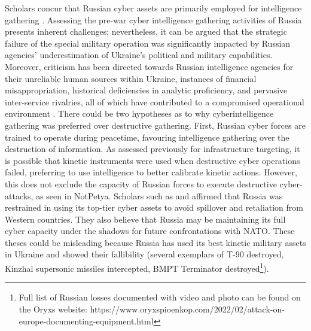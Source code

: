 Scholars concur that Russian cyber assets are primarily employed for intelligence gathering \parencite{baetman_2022_russias, levite_2023_integrating, beecroft_2022_evaluating, lin_2022_russian}. Assessing the pre-war cyber intelligence gathering activities of Russia presents inherent challenges; nevertheless, it can be argued that the strategic failure of the special military operation was significantly impacted by Russian agencies' underestimation of Ukraine's political and military capabilities. Moreover, criticism has been directed towards Russian intelligence agencies for their unreliable human sources within Ukraine, instances of financial misappropriation, historical deficiencies in analytic proficiency, and pervasive inter-service rivalries, all of which have contributed to a compromised operational environment \autocite{baetman_2022_russias}. There could be two hypotheses as to why cyberintelligence gathering was preferred over destructive gathering. First, Russian cyber forces are trained to operate during peacetime, favouring intelligence gathering over the destruction of information. As assessed previously for infrastructure targeting, it is possible that kinetic instruments were used when destructive cyber operations failed, preferring to use intelligence to better calibrate kinetic actions. However, this does not exclude the capacity of Russian forces to execute destructive cyber-attacks, as seen in NotPetya. Scholars such as \textcite{lin_2022_russian} and \textcite{levite_2023_integrating} affirmed that Russia was restrained in using its top-tier cyber assets to avoid spillover and retaliation from Western countries. They also believe that Russia may be maintaining its full cyber capacity under the shadows for future confrontations with NATO. These theses could be misleading because Russia has used its best kinetic military assets in Ukraine and showed their fallibility (several exemplars of T-90 destroyed, Kinzhal supersonic missiles intercepted, BMPT Terminator destroyed\footnote{Full list of Russian losses documented with video and photo can be found on the Oryxs website: https://www.oryxspioenkop.com/2022/02/attack-on-europe-documenting-equipment.html}).

